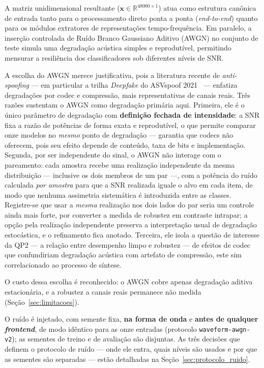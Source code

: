 \documentclass[12pt,a4paper]{article}
\begin{document}
A matriz unidimensional resultante ($\mathbf{x} \in
\mathbb{R}^{\num{48000} \times 1}$) atua como estrutura canônica de entrada
tanto para o processamento direto ponta a ponta (\textit{end-to-end}) quanto
para os módulos extratores de representações tempo-frequência. Em paralelo, a
inserção controlada de Ruído Branco Gaussiano Aditivo (AWGN) no conjunto de
teste simula uma degradação acústica simples e reprodutível, permitindo
mensurar a resiliência dos classificadores sob diferentes níveis de SNR.

A escolha do AWGN merece justificativa, pois a literatura recente de
\textit{anti-spoofing} --- em particular a trilha \textit{Deepfake} do ASVspoof
2021~\cite{yamagishi2021asvspoof} --- enfatiza degradações por codec e
compressão, mais representativas de canais reais. Três razões sustentam o
AWGN como degradação primária aqui. Primeira, ele é o único parâmetro de
degradação com \textbf{definição fechada de intensidade}: a SNR fixa a razão de
potências de forma exata e reprodutível, o que permite comparar onze modelos no
\emph{mesmo} ponto de degradação --- garantia que codecs não oferecem, pois seu
efeito depende de conteúdo, taxa de bits e implementação. Segunda, por ser
independente do sinal, o AWGN não interage com o pareamento: cada amostra
recebe uma realização independente da mesma distribuição --- inclusive os dois
membros de um par ---, com a potência do ruído calculada \emph{por amostra}
para que a SNR realizada iguale o alvo em cada item, de modo que nenhuma
assimetria sistemática é introduzida entre as classes. Registre-se que usar a
\emph{mesma} realização nos dois lados do par seria um controle ainda mais
forte, por converter a medida de robustez em contraste intrapar; a opção pela
realização independente preserva a interpretação usual de degradação
estocástica, e o refinamento fica anotado. Terceira, ele isola a questão de
interesse da QP2 --- a relação entre desempenho limpo e robustez --- de efeitos
de codec que confundiriam degradação acústica com artefato de compressão, este
sim correlacionado ao processo de síntese.

O custo dessa escolha é reconhecido: o AWGN cobre apenas degradação aditiva
estacionária, e a robustez a canais reais permanece não medida
(Seção~\ref{sec:limitacoes}).

O ruído é injetado, com semente fixa, \textbf{na forma de onda} e
\textbf{antes de qualquer \textit{frontend}}, de modo idêntico para as onze
entradas (protocolo \texttt{waveform-awgn-v2}); as sementes de treino e de
avaliação são disjuntas. As três decisões que definem o protocolo de ruído ---
onde ele entra, quais níveis são usados e por que as sementes são separadas ---
estão detalhadas na Seção~\ref{sec:protocolo_ruido}.
\end{document}
